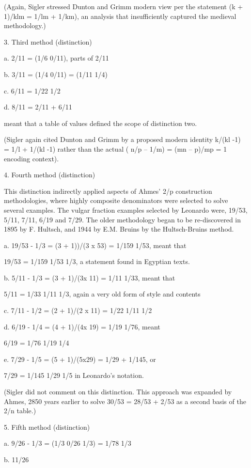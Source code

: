 \documentclass[12pt]{article}
\begin{document}
(Again, Sigler stressed Dunton and Grimm modern view per the statement (k + 1)/klm = 1/lm + 1/km), an analysis that insufficiently captured the medieval methodology.)

3. Third method (distinction)

a. 2/11 = (1/6 0/11), parts of 2/11

b. 3/11 = (1/4 0/11) = (1/11 1/4)

c. 6/11 = 1/22 1/2

d. 8/11 = 2/11 + 6/11

meant  that a table of values defined the scope of  distinction two.

(Sigler again cited Dunton and Grimm by a proposed modern identity k/(kl -1) = 1/l + 1/(kl -1) rather than the actual ( n/p – 1/m) = (mn – p)/mp = 1 encoding context).

4. Fourth method (distinction)

This distinction  indirectly applied  aspects of Ahmes' 2/p construction methodologies, where highly composite denominators were selected to solve several examples. The vulgar fraction examples selected by Leonardo were, 19/53, 5/11, 7/11, 6/19 and 7/29. The older methodology began to be re-discovered in 1895 by F. Hultsch, and 1944 by E.M. Bruins by the Hultsch-Bruins method.

a. 19/53 - 1/3 = (3 + 1))/(3 x 53) = 1/159 1/53, meant that

19/53 = 1/159 1/53 1/3, a statement found in Egyptian texts.

b. 5/11 - 1/3 = (3 + 1)/(3x 11) = 1/11 1/33, meant that

5/11 = 1/33 1/11 1/3, again a very old form of style and contents

c. 7/11 - 1/2 = (2 + 1)/(2 x 11) = 1/22 1/11 1/2

d. 6/19 - 1/4 = (4 + 1)/(4x 19) = 1/19 1/76, meant

6/19 = 1/76 1/19 1/4

e. 7/29 - 1/5 = (5 + 1)/(5x29) = 1/29 + 1/145, or

7/29 = 1/145 1/29 1/5 in Leonardo’s notation.

(Sigler did not comment on this distinction. This approach was expanded by Ahmes, 2850 years earlier to solve 30/53 = 28/53 + 2/53 as a second basis of the 2/n table.) 

5. Fifth method (distinction)

a. 9/26 - 1/3 = (1/3 0/26 1/3) = 1/78 1/3

b. 11/26
\end{document}
